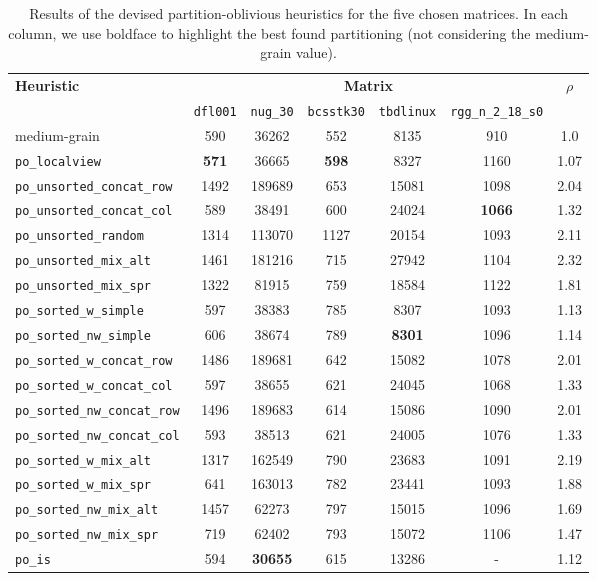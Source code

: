 \begin{table}[h]
	\centering

	\renewcommand{\arraystretch}{1.2}
	\begin{tabular}{|l||c|c|c|c|c||c|}
		\hline
		\multirow{2}{*}{\textbf{Heuristic}} &  \multicolumn{5}{|c||}{\textbf{Matrix}} & \multirow{2}{*}{$\rho$} \\ \cline{2-6}
		& \texttt{dfl001} & \texttt{nug\_30} & \texttt{bcsstk30} & \texttt{tbdlinux} & \texttt{rgg\_n\_2\_18\_s0} & \\ \hline
		medium-grain & 590 & 36262 & 552 & 8135 & 910 & 1.0 \\ \hline %
		\verb|po_localview|& \textbf{571} & 36665 & \textbf{598} & 8327 & 1160  & 1.07 \\  %
		\verb|po_unsorted_concat_row|& 1492 & 189689 & 653 & 15081 & 1098 & 2.04 \\ %
		\verb|po_unsorted_concat_col|& 589 & 38491  & 600 & 24024 & \textbf{1066} & 1.32 \\ %
		\verb|po_unsorted_random|& 1314 & 113070 & 1127 & 20154 & 1093 & 2.11 \\  %
		\verb|po_unsorted_mix_alt|& 1461 & 181216 & 715 & 27942 & 1104 & 2.32 \\  %
		\verb|po_unsorted_mix_spr|& 1322 & 81915 & 759 & 18584 & 1122 & 1.81 \\  %
		\verb|po_sorted_w_simple|& 597 & 38383 & 785  & 8307 & 1093 & 1.13 \\ %
		\verb|po_sorted_nw_simple|& 606 & 38674 & 789 & \textbf{8301} & 1096 & 1.14 \\ %
		\verb|po_sorted_w_concat_row|& 1486 & 189681 & 642 & 15082 & 1078 & 2.01 \\ %
		\verb|po_sorted_w_concat_col|& 597 & 38655 & 621 & 24045 & 1068 & 1.33 \\  %
		\verb|po_sorted_nw_concat_row|& 1496 & 189683 & 614 & 15086 & 1090 & 2.01 \\ %
		\verb|po_sorted_nw_concat_col|& 593 & 38513 & 621 & 24005 & 1076 & 1.33 \\ %
		\verb|po_sorted_w_mix_alt|& 1317 & 162549 & 790 & 23683 & 1091 & 2.19 \\ %
		\verb|po_sorted_w_mix_spr|& 641 & 163013 & 782 & 23441 & 1093 & 1.88 \\ %
		\verb|po_sorted_nw_mix_alt|& 1457 & 62273 & 797 & 15015 & 1096 & 1.69 \\ %
		\verb|po_sorted_nw_mix_spr|& 719 & 62402 & 793 & 15072 & 1106 & 1.47 \\  %
		\verb|po_is|& 594 & \textbf{30655} & 615 & 13286 & -  & 1.12 \\ %
		\hline
	\end{tabular}
	\caption{Results of the devised partition-oblivious heuristics for the five chosen matrices. In each column, we use boldface to highlight the best found partitioning (not considering the medium-grain value).} \label{tab:preliminary_po}
\end{table}

